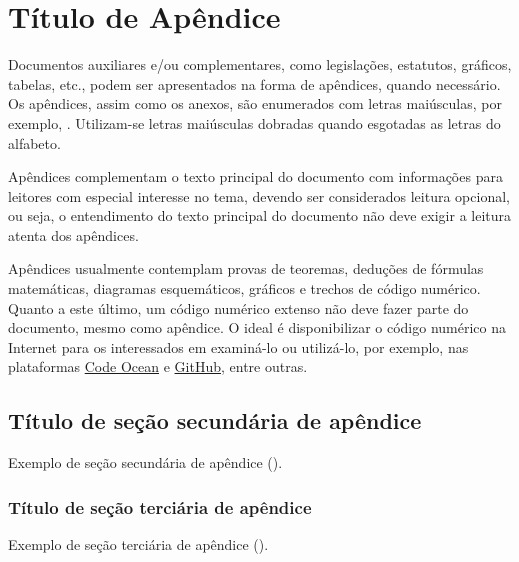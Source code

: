 
\graphicspath{%
  {./Post-Textual/}%
}

\chapter{Título de Apêndice}%
\label{chpt:apx-a}

Documentos auxiliares e/ou complementares, como legislações, estatutos, gráficos, tabelas, etc., podem ser apresentados na forma de apêndices, quando necessário.
Os apêndices, assim como os anexos, são enumerados com letras maiúsculas, por exemplo, .
Utilizam-se letras maiúsculas dobradas quando esgotadas as letras do alfabeto.

Apêndices complementam o texto principal do documento com informações para leitores com especial interesse no tema, devendo ser considerados leitura opcional, ou seja, o entendimento do texto principal do documento não deve exigir a leitura atenta dos apêndices.

Apêndices usualmente contemplam provas de teoremas, deduções de fórmulas matemáticas, diagramas esquemáticos, gráficos e trechos de código numérico.
Quanto a este último, um código numérico extenso não deve fazer parte do documento, mesmo como apêndice.
O ideal é disponibilizar o código numérico na Internet para os interessados em examiná-lo ou utilizá-lo, por exemplo, nas plataformas \href{https://codeocean.com/}{Code Ocean\LinkIcon} e \href{https://github.com}{GitHub\LinkIcon}, entre outras.

\section{Título de seção secundária de apêndice}%
\label{sect:apx-a2}

Exemplo de seção secundária de apêndice ().

\subsection{Título de seção terciária de apêndice}%
\label{ssect:apx-a3}

Exemplo de seção terciária de apêndice ().

